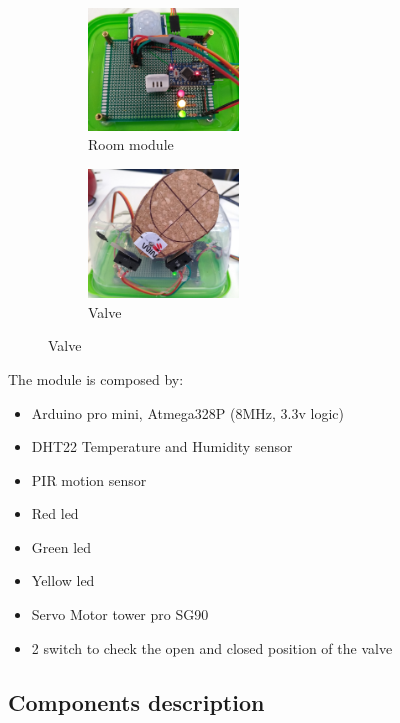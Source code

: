 \begin{figure}[h]
	\centering
	\begin{subfigure}{0.4\textwidth} %
		\includegraphics[width=4cm,keepaspectratio]{img/room_board}
		\caption{Room module}
		\label{fig:room_module}
		\end{subfigure}
	\vspace{1em} %
	\begin{subfigure}{0.4\textwidth} %
		\includegraphics[width=4cm,keepaspectratio]{img/valve}
		\caption{Valve}
		\label{fig:valve}
	\end{subfigure}
\end{figure}


The module is composed by:
\begin{itemize}
	\item Arduino pro mini, Atmega328P (8MHz, 3.3v logic)
	\item DHT22 Temperature and Humidity sensor
	\item PIR motion sensor
	\item Red led
	\item Green led
	\item Yellow led
	\item Servo Motor tower pro SG90
	\item 2 switch to check the open and closed position of the valve
\end{itemize}

\subsection{Components description}
